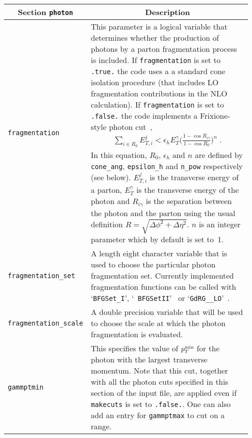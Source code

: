 	\begin{longtable}{p{3.5cm}p{12cm}}
		\toprule
		\multicolumn{1}{c}{{\textbf{Section} \texttt{photon}}} & \multicolumn{1}{c}{{\textbf{Description}}} \\ 
		\midrule
		{\tt fragmentation} &  This parameter is a logical variable that determines whether the production of photons 
		by a parton 
		fragmentation process is included. If {\tt fragmentation} is set to {\tt .true.} the code uses a a standard 
		cone isolation
		procedure (that includes LO fragmentation contributions in the NLO calculation).
		If {\tt fragmentation} is set to {\tt .false.} the code implements
		a Frixione-style photon cut~\cite{Frixione:1998jh},
		\begin{eqnarray}
		\sum_{i \in R_0} E_{T,i}^j  < \epsilon_h E_{T}^{\gamma} \bigg(\frac{1-\cos{R_{i\gamma}}}{1-\cos{R_0}}\bigg)^{n} 
		\;.
		\label{frixeq}
		\end{eqnarray}
		In this equation, $R_0$, $\epsilon_h$ and $n$ are defined by {\tt cone\_ang}, {\tt epsilon\_h} 
		and {\tt n\_pow}  respectively (see below).
		$E_{T,i}^{j}$ is the transverse energy of a parton, $E_{T}^\gamma$ is the
		transverse energy of the photon and $R_{i\gamma}$ is the separation between the photon and the parton using the 
		usual definition 
		$R=\sqrt{\Delta\phi^2+\Delta\eta^2}$. $n$ is an integer parameter which by default is set to~1. \\
		
		{\tt fragmentation\_set} & A length eight character variable that is used to choose the particular photon 
		fragmentation set.
		Currently implemented fragmentation functions can be called with `{\tt BFGSet\_I}', `{\tt 
			BFGSetII}'~\cite{Bourhis:1997yu} or `{\tt GdRG\_\_LO}'~\cite{GehrmannDeRidder:1998ba}. \\
		
		{\tt fragmentation\_scale} & A double precision variable that will be used to choose the scale 
		at which the photon fragmentation is evaluated. \\
		
		{\tt gammptmin} & This specifies the value
		of $p_T^{\rm min}$ for the photon with the largest transverse momentum.
		Note that this cut, together with all the photon cuts specified in this section
		of the input file, are applied even if {\tt makecuts} is set to {\tt .false.}.
		One can also add an entry for \texttt{gammptmax} to cut on a range. \\
		

\end{longtable}
